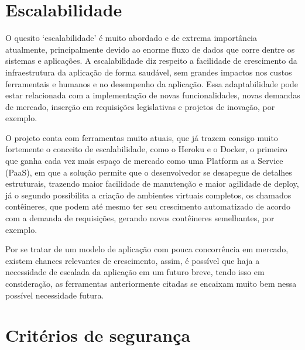 
\chapter{Escalabilidade}

O quesito ‘escalabilidade’ é muito abordado e de extrema importância atualmente, principalmente devido ao enorme fluxo de dados que corre dentre os sistemas e aplicações. A escalabilidade diz respeito a facilidade de crescimento da infraestrutura da aplicação de forma saudável, sem grandes impactos nos custos ferramentais e humanos e no desempenho da aplicação. Essa adaptabilidade pode estar relacionada com a implementação de novas funcionalidades, novas demandas de mercado, inserção em requisições legislativas e projetos de inovação, por exemplo. 

O projeto conta com ferramentas muito atuais, que já trazem consigo muito fortemente o conceito de escalabilidade, como o Heroku e o Docker, o primeiro que ganha cada vez mais espaço de mercado como uma Platform as a Service (PaaS), em que a solução permite que o desenvolvedor se desapegue de detalhes estruturais, trazendo maior facilidade de manutenção e maior agilidade de deploy, já o segundo possibilita a criação de ambientes virtuais completos, os chamados contêineres, que podem até mesmo ter seu crescimento automatizado de acordo com a demanda de requisições, gerando novos contêineres semelhantes, por exemplo. 

Por se tratar de um modelo de aplicação com pouca concorrência em mercado, existem chances relevantes de crescimento, assim, é possível que haja a necessidade de escalada da aplicação em um futuro breve, tendo isso em consideração, as ferramentas anteriormente citadas se encaixam muito bem nessa possível necessidade futura. 


\chapter{Critérios de segurança}

